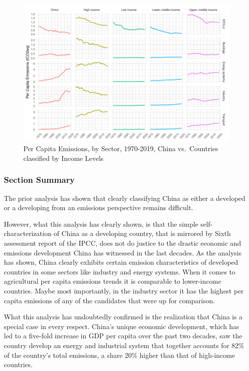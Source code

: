\documentclass[
  12pt,
]{article}
\numberwithin{equation}{section}
\numberwithin{table}{section}
\numberwithin{figure}{section}
\begin{document}
\begin{figure}
\centering
\includegraphics{Paper_files/figure-latex/unnamed-chunk-8-1.pdf}
\caption{Per Capita Emissions, by Sector, 1970-2019, China vs.~Countries
classified by Income Levels}
\end{figure}

\hypertarget{section-summary}{%
\subsubsection{Section Summary}\label{section-summary}}

The prior analysis has shown that clearly classifying China as either a
developed or a developing from an emissions perspective remains
difficult.

However, what this analysis has clearly shown, is that the simple
self-characterization of China as a developing country, that is mirrored
by Sixth assessment report of the IPCC, does not do justice to the
drastic economic and emissions development China has witnessed in the
last decades. As the analysis has shown, China clearly exhibits certain
emission characteristics of developed countries in some sectors like
industry and energy systems. When it comes to agricultural per capita
emissions trends it is comparable to lower-income countries. Maybe most
importantly, in the industry sector it has the highest per capita
emissions of any of the candidates that were up for comparison.

What this analysis has undoubtedly confirmed is the realization that
China is a special case in every respect. China's unique economic
development, which has led to a five-fold increase in GDP per capita
over the past two decades, saw the country develop an energy and
industrial system that together accounts for 82\% of the country's total
emissions, a share 20\% higher than that of high-income countries.
\end{document}
